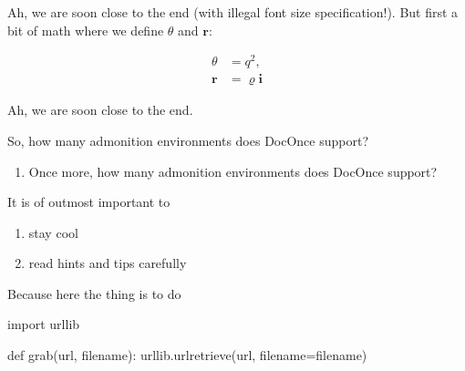 \documentclass[%
oneside,                 %
final,                   %
10pt]{article}
\newenvironment{notice_mdfboxadmon}[1][]{
\begin{notice_mdfboxmdframed}[frametitle=#1]
}
{
\end{notice_mdfboxmdframed}
}
\newenvironment{warning_mdfboxadmon}[1][]{
\begin{warning_mdfboxmdframed}[frametitle=#1]
}
{
\end{warning_mdfboxmdframed}
}
\newenvironment{question_mdfboxadmon}[1][]{
\begin{question_mdfboxmdframed}[frametitle=#1]
}
{
\end{question_mdfboxmdframed}
}
\begin{document}
\begin{notice_mdfboxadmon}
Ah, we are soon close to the end (with illegal font size specification!).
But first a bit of math where we define $\theta$ and $\bm{r}$:

\begin{align*}
\theta &= q^2,\\
\bm{r} &= \varrho\bm{i}
\end{align*}
\end{notice_mdfboxadmon} %





\begin{notice_mdfboxadmon}[Point1.]
Ah, we are soon close to the end.
\end{notice_mdfboxadmon} %




\begin{question_mdfboxadmon}[Question.]
So, how many admonition environments does DocOnce support?
\end{question_mdfboxadmon} %




\begin{question_mdfboxadmon}[Question.]
\begin{enumerate}
 \item Once more, how many admonition environments does DocOnce support?
\end{enumerate}

\noindent
\end{question_mdfboxadmon} %




\begin{warning_mdfboxadmon}[Tip.]
It is of outmost important to

\begin{enumerate}
\item stay cool

\item read hints and tips carefully
\end{enumerate}

\noindent
Because here the thing is to do

import urllib

def grab(url, filename):
    urllib.urlretrieve(url, filename=filename)
\end{warning_mdfboxadmon} %
\end{document}

